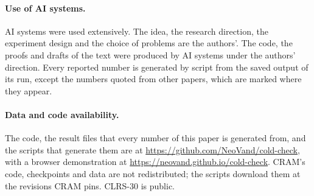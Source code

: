 \paragraph{Use of AI systems.} AI systems were used extensively. The idea, the research direction, the experiment design
and the choice of problems are the authors'. The code, the proofs and drafts of the text were produced by AI systems
under the authors' direction. Every reported number is generated by script from the saved output of its run, except
the numbers quoted from other papers, which are marked where they appear.

\paragraph{Data and code availability.} The code, the result files that every number of this paper is generated from,
and the scripts that generate them are at \url{https://github.com/NeoVand/cold-check}, with a browser demonstration at
\url{https://neovand.github.io/cold-check}. CRAM's code, checkpoints and data are not redistributed; the scripts download
them at the revisions CRAM pins. CLRS-30 is public\cite{velickovic2022clrs}.
